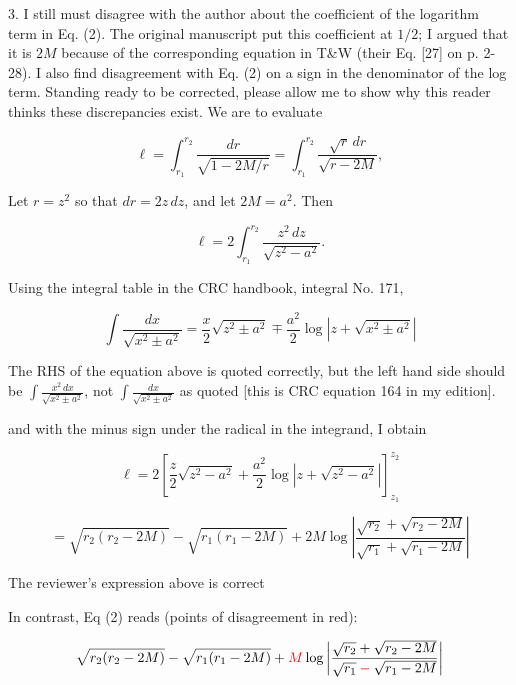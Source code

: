 \documentclass[12pt]{article}
\begin{document}
3. I still must disagree with the author about the coefficient of the
logarithm term in Eq. (2).  The original manuscript put this
coefficient at $1/2$; I argued that it is $2M$ because of the
corresponding equation in T\&W (their Eq. [27] on p. 2-28).  I also
find disagreement with Eq. (2) on a sign in the denominator of the log
term.  Standing ready to be corrected, please allow me to show why
this reader thinks these discrepancies exist.  We are to evaluate

\[
\ell=\int_{r_1}^{r_2}\frac{dr}{\sqrt{1-2M/r}} =
\int_{r_1}^{r_2}\frac{\sqrt{r}\,dr}{\sqrt{r-2M}},
\]

Let $r=z^2$ so that $dr=2z\,dz$, and let $2M=a^2$.  Then 

\[
\ell=2\int_{r_1}^{r_2} \frac{z^2\,dz}{\sqrt{z^2-a^2}}.
\]

 Using the integral table in the CRC handbook, integral No. 171,

\[
\int\frac{dx}{\sqrt{x^2\pm a^2}}=\frac{x}{2} \sqrt{z^2\pm a^2}
\mp \frac{a^2}{2}\log\left| z+\sqrt{x^2\pm a^2}\right|
\]


{\color{blue} The RHS of the equation above is quoted correctly, but
  the left hand side should be $\int\frac{x^2\,dx}{\sqrt{x^2\pm
      a^2}}$, not $\int\frac{dx}{\sqrt{x^2\pm a^2}}$ as quoted [this
    is CRC equation 164 in my edition].  }


 and with the minus sign under the radical in the integrand, I obtain

\[
\ell = 2\left[
  \frac{z}{2}\sqrt{z^2-a^2} + \frac{a^2}{2}\log\left|z+\sqrt{z^2-a^2}\right|
  \right]_{z_1}^{z_2}
\]

\[
=
\sqrt{r_2(r_2-2M)}-\sqrt{r_1(r_1-2M)} + 2M\log\left|
\frac{\sqrt{r_2}+\sqrt{r_2-2M}}{\sqrt{r_1}+\sqrt{r_1-2M}}\right|
\]


{\color{blue} The reviewer's expression above is correct}

In contrast, Eq (2) reads (points of disagreement in red):


\[
\sqrt{r_2(r_2-2M)}-\sqrt{r_1(r_1-2M)} 
+\color{red}M
\color{black}\log\left|
\frac{\sqrt{r_2}+\sqrt{r_2-2M}}{\sqrt{r_1}
  \color{red}-
  \color{black}\sqrt{r_1-2M}}\right|
\]
\end{document}
